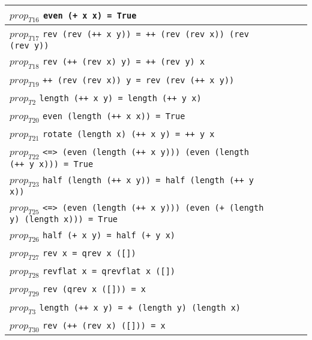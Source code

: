 \documentclass{article}
\begin{document}
\begin{longtable}{p{10cm} || c | c | c | c | }
\hline
$prop_{T16}$ \newline \verb`even (+ x x) = True` &  &  &  &  \\
\hline
$prop_{T17}$ \newline \verb`rev (rev (++ x y)) = ++ (rev (rev x)) (rev (rev y))` &  &  &  &  \\
\hline
$prop_{T18}$ \newline \verb`rev (++ (rev x) y) = ++ (rev y) x` &  &  &  &  \\
\hline
$prop_{T19}$ \newline \verb`++ (rev (rev x)) y = rev (rev (++ x y))` &  &  &  &  \\
\hline
$prop_{T2}$ \newline \verb`length (++ x y) = length (++ y x)` &  &  &  &  \\
\hline
$prop_{T20}$ \newline \verb`even (length (++ x x)) = True` &  &  &  &  \\
\hline
$prop_{T21}$ \newline \verb`rotate (length x) (++ x y) = ++ y x` &  &  &  &  \\
\hline
$prop_{T22}$ \newline \verb`<=> (even (length (++ x y))) (even (length (++ y x))) = True` &  &  &  &  \\
\hline
$prop_{T23}$ \newline \verb`half (length (++ x y)) = half (length (++ y x))` &  &  &  &  \\
\hline
$prop_{T25}$ \newline \verb`<=> (even (length (++ x y))) (even (+ (length y) (length x))) = True` &  &  &  &  \\
\hline
$prop_{T26}$ \newline \verb`half (+ x y) = half (+ y x)` &  &  &  &  \\
\hline
$prop_{T27}$ \newline \verb`rev x = qrev x ([])` &  &  &  &  \\
\hline
$prop_{T28}$ \newline \verb`revflat x = qrevflat x ([])` &  &  &  &  \\
\hline
$prop_{T29}$ \newline \verb`rev (qrev x ([])) = x` &  &  &  &  \\
\hline
$prop_{T3}$ \newline \verb`length (++ x y) = + (length y) (length x)` &  &  &  &  \\
\hline
$prop_{T30}$ \newline \verb`rev (++ (rev x) ([])) = x` &  &  &  &  \\

\end{longtable}
\end{document}

